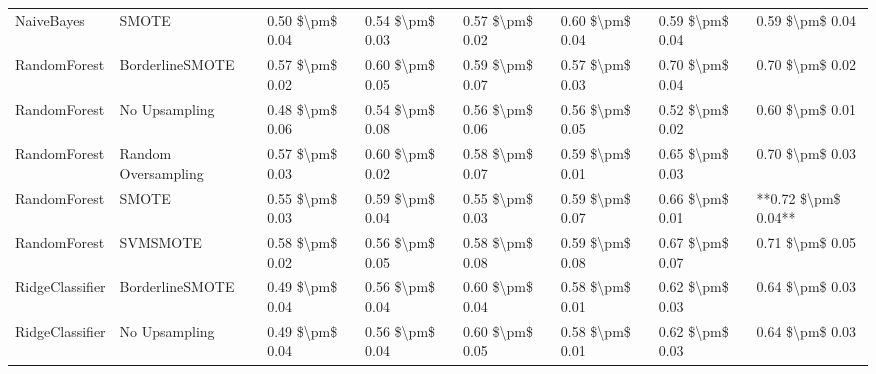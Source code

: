 \begin{tabular}{llllllll}
                     NaiveBayes &                         SMOTE & 0.50 \$\textbackslash pm\$ 0.04 &           0.54 \$\textbackslash pm\$ 0.03 &       0.57 \$\textbackslash pm\$ 0.02 &        0.60 \$\textbackslash pm\$ 0.04 &                         0.59 \$\textbackslash pm\$ 0.04 &     0.59 \$\textbackslash pm\$ 0.04 \\
                   RandomForest &               BorderlineSMOTE & 0.57 \$\textbackslash pm\$ 0.02 &           0.60 \$\textbackslash pm\$ 0.05 &       0.59 \$\textbackslash pm\$ 0.07 &        0.57 \$\textbackslash pm\$ 0.03 &                         0.70 \$\textbackslash pm\$ 0.04 &     0.70 \$\textbackslash pm\$ 0.02 \\
                   RandomForest &                 No Upsampling & 0.48 \$\textbackslash pm\$ 0.06 &           0.54 \$\textbackslash pm\$ 0.08 &       0.56 \$\textbackslash pm\$ 0.06 &        0.56 \$\textbackslash pm\$ 0.05 &                         0.52 \$\textbackslash pm\$ 0.02 &     0.60 \$\textbackslash pm\$ 0.01 \\
                   RandomForest &           Random Oversampling & 0.57 \$\textbackslash pm\$ 0.03 &           0.60 \$\textbackslash pm\$ 0.02 &       0.58 \$\textbackslash pm\$ 0.07 &        0.59 \$\textbackslash pm\$ 0.01 &                         0.65 \$\textbackslash pm\$ 0.03 &     0.70 \$\textbackslash pm\$ 0.03 \\
                   RandomForest &                         SMOTE & 0.55 \$\textbackslash pm\$ 0.03 &           0.59 \$\textbackslash pm\$ 0.04 &       0.55 \$\textbackslash pm\$ 0.03 &        0.59 \$\textbackslash pm\$ 0.07 &                         0.66 \$\textbackslash pm\$ 0.01 & **0.72 \$\textbackslash pm\$ 0.04** \\
                   RandomForest &                      SVMSMOTE & 0.58 \$\textbackslash pm\$ 0.02 &           0.56 \$\textbackslash pm\$ 0.05 &       0.58 \$\textbackslash pm\$ 0.08 &        0.59 \$\textbackslash pm\$ 0.08 &                         0.67 \$\textbackslash pm\$ 0.07 &     0.71 \$\textbackslash pm\$ 0.05 \\
                RidgeClassifier &               BorderlineSMOTE & 0.49 \$\textbackslash pm\$ 0.04 &           0.56 \$\textbackslash pm\$ 0.04 &       0.60 \$\textbackslash pm\$ 0.04 &        0.58 \$\textbackslash pm\$ 0.01 &                         0.62 \$\textbackslash pm\$ 0.03 &     0.64 \$\textbackslash pm\$ 0.03 \\
                RidgeClassifier &                 No Upsampling & 0.49 \$\textbackslash pm\$ 0.04 &           0.56 \$\textbackslash pm\$ 0.04 &       0.60 \$\textbackslash pm\$ 0.05 &        0.58 \$\textbackslash pm\$ 0.01 &                         0.62 \$\textbackslash pm\$ 0.03 &     0.64 \$\textbackslash pm\$ 0.03 \\

\end{tabular}
